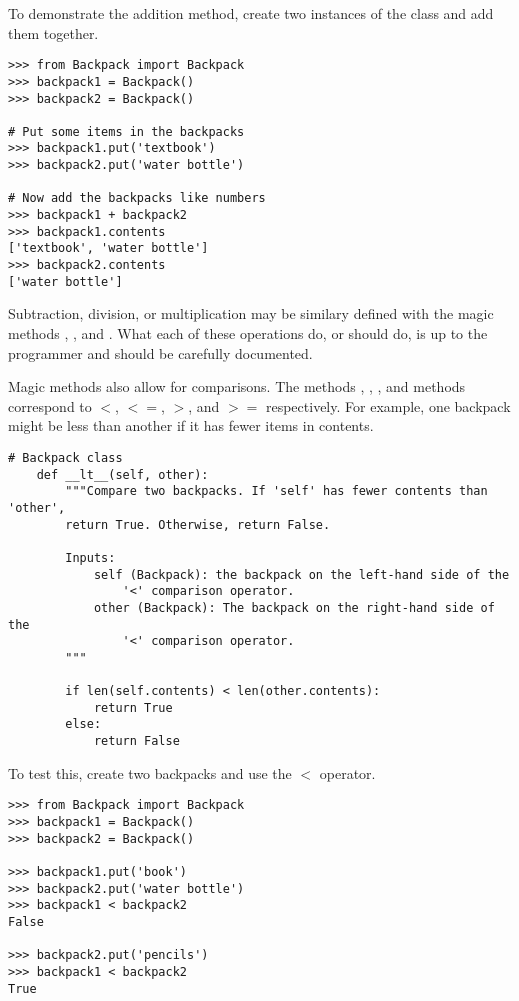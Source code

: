 To demonstrate the addition method, create two instances of the  class and add them together.

\begin{lstlisting}
>>> from Backpack import Backpack
>>> backpack1 = Backpack()
>>> backpack2 = Backpack()

# Put some items in the backpacks
>>> backpack1.put('textbook')
>>> backpack2.put('water bottle')

# Now add the backpacks like numbers
>>> backpack1 + backpack2
>>> backpack1.contents
['textbook', 'water bottle']
>>> backpack2.contents
['water bottle']
\end{lstlisting}

Subtraction, division, or multiplication may be similary defined with the magic methods , , and .
What each of these operations do, or should do, is up to the programmer and should be carefully documented.

Magic methods also allow for comparisons.
The methods , , , and  methods correspond to $<$, $<=$, $>$, and $>=$ respectively.
For example, one backpack might be less than another if it has fewer items in contents.

\begin{lstlisting}
# Backpack class
    def __lt__(self, other):
        """Compare two backpacks. If 'self' has fewer contents than 'other',
        return True. Otherwise, return False.
        
        Inputs:
            self (Backpack): the backpack on the left-hand side of the
                '<' comparison operator.
            other (Backpack): The backpack on the right-hand side of the
                '<' comparison operator.
        """

        if len(self.contents) < len(other.contents):
            return True
        else:
            return False
\end{lstlisting}

To test this, create two backpacks and use the $<$ operator.
\begin{lstlisting}
>>> from Backpack import Backpack
>>> backpack1 = Backpack()
>>> backpack2 = Backpack()

>>> backpack1.put('book')
>>> backpack2.put('water bottle')
>>> backpack1 < backpack2
False

>>> backpack2.put('pencils')
>>> backpack1 < backpack2
True
\end{lstlisting}

